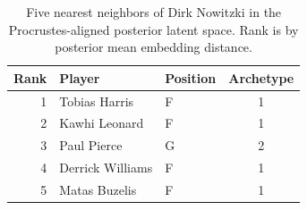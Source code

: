 \begin{table}[htbp]
  \centering\small
  \begin{tabular}{rllc}
    \toprule
    Rank & Player & Position & Archetype \\
    \midrule
    1 & Tobias Harris & F & 1 \\
    2 & Kawhi Leonard & F & 1 \\
    3 & Paul Pierce & G & 2 \\
    4 & Derrick Williams & F & 1 \\
    5 & Matas Buzelis & F & 1 \\
    \bottomrule
  \end{tabular}
  \caption{Five nearest neighbors of Dirk Nowitzki in the Procrustes-aligned posterior latent space. Rank is by posterior mean embedding distance.}
  \label{tab:Dirk_Nowitzki_neighbors}
\end{table}

